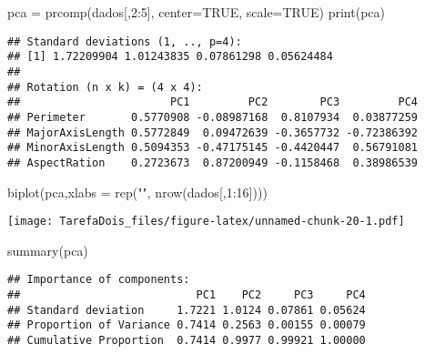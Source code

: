 \documentclass[
]{article}
\newenvironment{Shaded}{\begin{snugshade}}{\end{snugshade}}
\newcommand{\AttributeTok}[1]{\textcolor[rgb]{0.77,0.63,0.00}{#1}}
\newcommand{\ConstantTok}[1]{\textcolor[rgb]{0.00,0.00,0.00}{#1}}
\newcommand{\DecValTok}[1]{\textcolor[rgb]{0.00,0.00,0.81}{#1}}
\newcommand{\FunctionTok}[1]{\textcolor[rgb]{0.00,0.00,0.00}{#1}}
\newcommand{\NormalTok}[1]{#1}
\newcommand{\OtherTok}[1]{\textcolor[rgb]{0.56,0.35,0.01}{#1}}
\newcommand{\SpecialCharTok}[1]{\textcolor[rgb]{0.00,0.00,0.00}{#1}}
\newcommand{\StringTok}[1]{\textcolor[rgb]{0.31,0.60,0.02}{#1}}
\begin{document}
\begin{Shaded}
\begin{Highlighting}[]
\NormalTok{pca }\OtherTok{=} \FunctionTok{prcomp}\NormalTok{(dados[,}\DecValTok{2}\SpecialCharTok{:}\DecValTok{5}\NormalTok{], }\AttributeTok{center=}\ConstantTok{TRUE}\NormalTok{, }\AttributeTok{scale=}\ConstantTok{TRUE}\NormalTok{)}
\FunctionTok{print}\NormalTok{(pca)}
\end{Highlighting}
\end{Shaded}

\begin{verbatim}
## Standard deviations (1, .., p=4):
## [1] 1.72209904 1.01243835 0.07861298 0.05624484
## 
## Rotation (n x k) = (4 x 4):
##                       PC1         PC2        PC3         PC4
## Perimeter       0.5770908 -0.08987168  0.8107934  0.03877259
## MajorAxisLength 0.5772849  0.09472639 -0.3657732 -0.72386392
## MinorAxisLength 0.5094353 -0.47175145 -0.4420447  0.56791081
## AspectRation    0.2723673  0.87200949 -0.1158468  0.38986539
\end{verbatim}

\begin{Shaded}
\begin{Highlighting}[]
\FunctionTok{biplot}\NormalTok{(pca,}\AttributeTok{xlabs =} \FunctionTok{rep}\NormalTok{(}\StringTok{""}\NormalTok{, }\FunctionTok{nrow}\NormalTok{(dados[,}\DecValTok{1}\SpecialCharTok{:}\DecValTok{16}\NormalTok{])))}
\end{Highlighting}
\end{Shaded}

\texttt{[image: TarefaDois\_files/figure-latex/unnamed-chunk-20-1.pdf]}

\begin{Shaded}
\begin{Highlighting}[]
\FunctionTok{summary}\NormalTok{(pca)}
\end{Highlighting}
\end{Shaded}

\begin{verbatim}
## Importance of components:
##                           PC1    PC2     PC3     PC4
## Standard deviation     1.7221 1.0124 0.07861 0.05624
## Proportion of Variance 0.7414 0.2563 0.00155 0.00079
## Cumulative Proportion  0.7414 0.9977 0.99921 1.00000
\end{verbatim}
\end{document}
